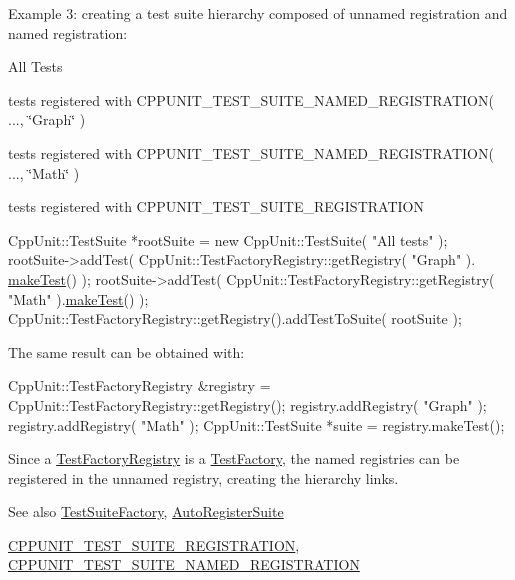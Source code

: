 Example 3\+: creating a test suite hierarchy composed of unnamed registration and named registration\+:
\begin{DoxyItemize}
\item All Tests
\begin{DoxyItemize}
\item tests registered with C\+P\+P\+U\+N\+I\+T\+\_\+\+T\+E\+S\+T\+\_\+\+S\+U\+I\+T\+E\+\_\+\+N\+A\+M\+E\+D\+\_\+\+R\+E\+G\+I\+S\+T\+R\+A\+T\+I\+O\+N( ..., \char`\"{}\+Graph\char`\"{} )
\item tests registered with C\+P\+P\+U\+N\+I\+T\+\_\+\+T\+E\+S\+T\+\_\+\+S\+U\+I\+T\+E\+\_\+\+N\+A\+M\+E\+D\+\_\+\+R\+E\+G\+I\+S\+T\+R\+A\+T\+I\+O\+N( ..., \char`\"{}\+Math\char`\"{} )
\item tests registered with C\+P\+P\+U\+N\+I\+T\+\_\+\+T\+E\+S\+T\+\_\+\+S\+U\+I\+T\+E\+\_\+\+R\+E\+G\+I\+S\+T\+R\+A\+T\+I\+O\+N
\end{DoxyItemize}
\end{DoxyItemize}


\begin{DoxyCode}
CppUnit::TestSuite *rootSuite = \textcolor{keyword}{new} CppUnit::TestSuite( \textcolor{stringliteral}{"All tests"} );
rootSuite->addTest( CppUnit::TestFactoryRegistry::getRegistry( \textcolor{stringliteral}{"Graph"} ).
      \hyperlink{class_test_factory_registry_a35b9c93f7129c0d9773d344b79e2e3ac}{makeTest}() );
rootSuite->addTest( CppUnit::TestFactoryRegistry::getRegistry( \textcolor{stringliteral}{"Math"} ).\hyperlink{class_test_factory_registry_a35b9c93f7129c0d9773d344b79e2e3ac}{makeTest}() );
CppUnit::TestFactoryRegistry::getRegistry().addTestToSuite( rootSuite );
\end{DoxyCode}


The same result can be obtained with\+: 
\begin{DoxyCode}
CppUnit::TestFactoryRegistry &registry = CppUnit::TestFactoryRegistry::getRegistry();
registry.addRegistry( \textcolor{stringliteral}{"Graph"} );
registry.addRegistry( \textcolor{stringliteral}{"Math"} );
CppUnit::TestSuite *suite = registry.makeTest();
\end{DoxyCode}


Since a \hyperlink{class_test_factory_registry}{Test\+Factory\+Registry} is a \hyperlink{class_test_factory}{Test\+Factory}, the named registries can be registered in the unnamed registry, creating the hierarchy links.

\begin{DoxySeeAlso}{See also}
\hyperlink{class_test_suite_factory}{Test\+Suite\+Factory}, \hyperlink{class_auto_register_suite}{Auto\+Register\+Suite} 

\hyperlink{group___creating_test_suite_ga2f4071eec88d1e306665ada0f2dd80e4}{C\+P\+P\+U\+N\+I\+T\+\_\+\+T\+E\+S\+T\+\_\+\+S\+U\+I\+T\+E\+\_\+\+R\+E\+G\+I\+S\+T\+R\+A\+T\+I\+O\+N}, \hyperlink{group___creating_test_suite_ga028a5855a40ad3836e2a26aa48cd4c91}{C\+P\+P\+U\+N\+I\+T\+\_\+\+T\+E\+S\+T\+\_\+\+S\+U\+I\+T\+E\+\_\+\+N\+A\+M\+E\+D\+\_\+\+R\+E\+G\+I\+S\+T\+R\+A\+T\+I\+O\+N} 
\end{DoxySeeAlso}



